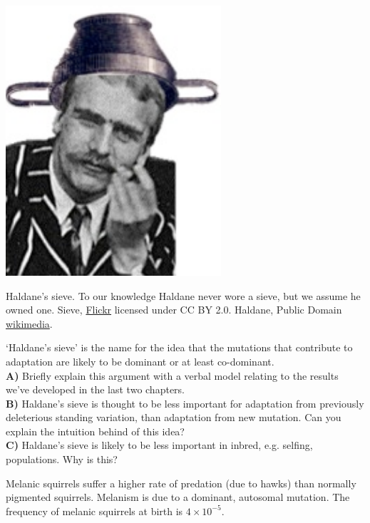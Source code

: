 {\begin{marginfigure}
  \begin{center}
    \includegraphics[width=0.6\textwidth]{figures/haldanes_sieve.png}
\end{center}
\caption{Haldane's sieve. To our knowledge Haldane never wore a sieve,
  but we assume he owned one. Sieve,
  \href{https://www.flickr.com/photos/fdctsevilla/4306301234/in/photostream/}{Flickr}
  licensed under CC BY 2.0. Haldane, Public Domain \href{https://en.wikipedia.org/wiki/J._B._S._Haldane\#/media/File:J._B._S._Haldane.jpg}{wikimedia}.} \label{fig:haldanes_sieve}
\end{marginfigure}

\begin{question}
`Haldane's sieve' is the name for the idea that the mutations that contribute to adaptation are likely to be dominant or at least co-dominant. \\
{\bf A)} Briefly explain this argument with a verbal model relating to the
results we've developed in the last two chapters. \\
{\bf B)} Haldane's sieve is thought to be less important for adaptation from previously deleterious standing variation, than adaptation from new mutation. Can you explain the intuition behind of this idea?\\
{\bf C)} Haldane's sieve is likely to be less important in inbred,
e.g. selfing, populations. Why is this? \\

\end{question}

\begin{question}
Melanic squirrels suffer a higher rate of predation (due to hawks) than normally pigmented squirrels. Melanism is due to a dominant, autosomal mutation. The frequency of melanic squirrels at birth is $4 \times 10^{-5}$.\\


\end{question}}
